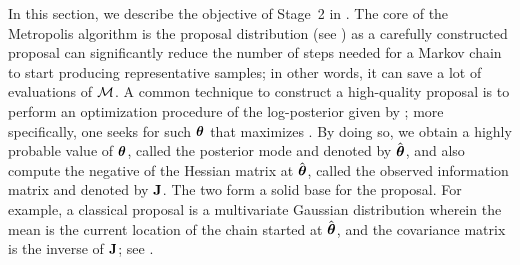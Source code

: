 In this section, we describe the objective of Stage~2 in .
The core of the Metropolis algorithm is the proposal distribution (see ) as a carefully constructed proposal can significantly reduce the number of steps needed for a Markov chain to start producing representative samples; in other words, it can save a lot of evaluations of $\model$.
A common technique to construct a high-quality proposal is to perform an optimization procedure of the log-posterior given by ; more specifically, one seeks for such ${\boldsymbol\theta}$ that maximizes .
By doing so, we obtain a highly probable value of ${\boldsymbol\theta}$, called the posterior mode and denoted by $\hat{{\boldsymbol\theta}}$, and also compute the negative of the Hessian matrix at $\hat{{\boldsymbol\theta}}$, called the observed information matrix and denoted by $\mathbf{J}$. The two form a solid base for the proposal.
For example, a classical proposal is a multivariate Gaussian distribution wherein the mean is the current location of the chain started at $\hat{{\boldsymbol\theta}}$, and the covariance matrix is the inverse of $\mathbf{J}$; see \cite{gelman2004, bernardo2007}.
